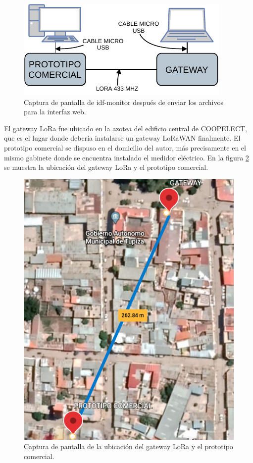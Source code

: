 \begin{figure}[ht]
	\centering
	\includegraphics[scale=1]{./Figures/test_lora_bank.pdf}
	\caption{Captura de pantalla de idf-monitor después de enviar los archivos para la interfaz web.}
	\label{fig:testLoraBank}
\end{figure}

El gateway LoRa fue ubicado en la azotea del edificio central de COOPELECT, que es el lugar donde debería instalarse un gateway LoRaWAN finalmente. El prototipo comercial se dispuso en el domicilio del autor, más precisamente en el mismo gabinete donde se encuentra instalado el medidor eléctrico. En la figura \ref{fig:testLoraUbi} se muestra la ubicación del gateway LoRa y el prototipo comercial.

\begin{figure}[ht]
	\centering
	\includegraphics[scale=0.41]{./Figures/test_lora_location.png}
	\caption{Captura de pantalla de la ubicación del gateway LoRa y el prototipo comercial.}
	\label{fig:testLoraUbi}
\end{figure}

